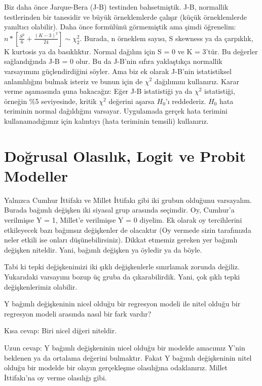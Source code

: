 \documentclass[
]{book}
\begin{document}
Biz daha önce Jarque-Bera (J-B) testinden bahsetmiştik. J-B, normallik testlerinden bir tanesidir ve büyük örneklemlerde çalışır (küçük örneklemlerde yanıltıcı olabilir). Daha önce formülünü görmemiştik ama şimdi öğrenelim: \(n * [\frac{S^2}{6} + \frac{(K-3)^2}{24}]\sim\chi^2_2\). Burada, n örneklem sayısı, S skewness ya da çarpıklık, K kurtosis ya da basıklıktır. Normal dağılım için S = 0 ve K = 3'tür. Bu değerler sağlandığında J-B = 0 olur. Bu da J-B'nin sıfıra yaklaştıkça normallik varsayımını güçlendirdiğini söyler. Ama biz ek olarak J-B'nin istatistiksel anlamlılığını bulmak isteriz ve bunun için de \(\chi^2\) dağılımını kullanırız. Karar verme aşamasında şuna bakacağız: Eğer J-B istatistiği ya da \(\chi^2\) istatistiği, örneğin \%5 seviyesinde, kritik \(\chi^2\) değerini aşarsa \(H_0\)'ı reddederiz. \(H_0\) hata teriminin normal dağıldığını varsayar. Uygulamada gerçek hata terimini kullanamadığımız için kalıntıyı (hata teriminin temsili) kullanırız.

\hypertarget{doux11frusal-olasux131lux131k-logit-ve-probit-modeller}{%
\chapter{Doğrusal Olasılık, Logit ve Probit Modeller}\label{doux11frusal-olasux131lux131k-logit-ve-probit-modeller}}

Yalnızca Cumhur İttifakı ve Millet İttifakı gibi iki grubun olduğunu varsayalım. Burada bağımlı değişken iki siyasal grup arasında seçimdir. Oy, Cumhur'a verilmişse Y = 1, Millet'e verilmişse Y = 0 diyelim. Ek olarak oy tercihlerini etkileyecek bazı bağımsız değişkenler de olacaktır (Oy vermede sizin tarafınızda neler etkili ise onları düşünebilirsiniz). Dikkat etmemiz gereken yer bağımlı değişken niteldir. Yani, bağımlı değişken ya öyledir ya da böyle.

Tabi ki tepki değişkenimizi iki şıklı değişkenlerle sınırlamak zorunda değiliz. Yukarıdaki varsayımı bozup üç gruba da çıkarabilirdik. Yani, çok şıklı tepki değişkenlerimiz olabilir.

Y bağımlı değişkeninin nicel olduğu bir regresyon modeli ile nitel olduğu bir regresyon modeli arasında nasıl bir fark vardır?

Kısa cevap: Biri nicel diğeri niteldir.

Uzun cevap: Y bağımlı değişkeninin nicel olduğu bir modelde amacımız Y'nin beklenen ya da ortalama değerini bulmaktır. Fakat Y bağımlı değişkeninin nitel olduğu bir modelde bir olayın gerçekleşme olasılığına odaklanırız. Millet İttifakı'na oy verme olasılığı gibi.
\end{document}
